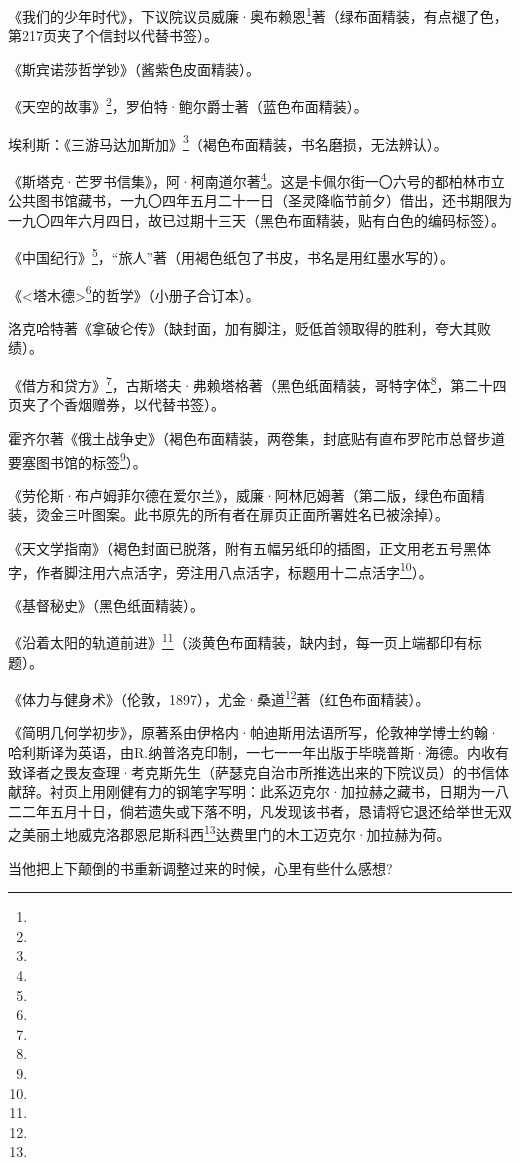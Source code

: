\par 《我们的少年时代》，下议院议员威廉·奥布赖恩\footnote{}著（绿布面精装，有点褪了色，第217页夹了个信封以代替书签）。
\par 《斯宾诺莎哲学钞》（酱紫色皮面精装）。
\par 《天空的故事》\footnote{}，罗伯特·鲍尔爵士著（蓝色布面精装）。
\par 埃利斯：《三游马达加斯加》\footnote{}（褐色布面精装，书名磨损，无法辨认）。
\par 《斯塔克·芒罗书信集》，阿·柯南道尔著\footnote{}。这是卡佩尔街一〇六号的都柏林市立公共图书馆藏书，一九〇四年五月二十一日（圣灵降临节前夕）借出，还书期限为一九〇四年六月四日，故已过期十三天（黑色布面精装，贴有白色的编码标签）。
\par 《中国纪行》\footnote{}，“旅人”著（用褐色纸包了书皮，书名是用红墨水写的）。
\par 《<塔木德>\footnote{}的哲学》（小册子合订本）。
\par 洛克哈特著《拿破仑传》（缺封面，加有脚注，贬低首领取得的胜利，夸大其败绩）。
\par 《借方和贷方》\footnote{}，古斯塔夫·弗赖塔格著（黑色纸面精装，哥特字体\footnote{}，第二十四页夹了个香烟赠券，以代替书签）。
\par 霍齐尔著《俄土战争史》（褐色布面精装，两卷集，封底贴有直布罗陀市总督步道要塞图书馆的标签\footnote{}）。
\par 《劳伦斯·布卢姆菲尔德在爱尔兰》，威廉·阿林厄姆著（第二版，绿色布面精装，烫金三叶图案。此书原先的所有者在扉页正面所署姓名已被涂掉）。
\par 《天文学指南》（褐色封面已脱落，附有五幅另纸印的插图，正文用老五号黑体字，作者脚注用六点活字，旁注用八点活字，标题用十二点活字\footnote{}）。
\par 《基督秘史》（黑色纸面精装）。
\par 《沿着太阳的轨道前进》\footnote{}（淡黄色布面精装，缺内封，每一页上端都印有标题）。
\par 《体力与健身术》（伦敦，1897），尤金·桑道\footnote{}著（红色布面精装）。
\par 《简明几何学初步》，原著系由伊格内·帕迪斯用法语所写，伦敦神学博士约翰·哈利斯译为英语，由R.纳普洛克印制，一七一一年出版于毕晓普斯·海德。内收有致译者之畏友查理·考克斯先生（萨瑟克自治市所推选出来的下院议员）的书信体献辞。衬页上用刚健有力的钢笔字写明：此系迈克尔·加拉赫之藏书，日期为一八二二年五月十日，倘若遗失或下落不明，凡发现该书者，恳请将它退还给举世无双之美丽土地威克洛郡恩尼斯科西\footnote{}达费里门的木工迈克尔·加拉赫为荷。
\par 当他把上下颠倒的书重新调整过来的时候，心里有些什么感想?
